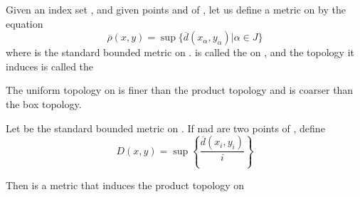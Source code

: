 \begin{definition}\label{def:UniformMetric}
      Given an index set , and given points  and  of , let us define a metric \mt{
            \overline{\rho}
      } on  by the equation
      \begin{equation*}
            \overline{\rho}(x,y) = \sup\{
                  \overline{d}(x_{\alpha},y_{\alpha}) | \alpha \in J
            \}
      \end{equation*}
      where  is the standard bounded metric on . \mt{
            \overline{\rho}
      } is called the  on , and the topology it induces is called the 
\end{definition}

\begin{theorem} \omitObviuos
      The uniform topology on  is finer than the product topology and is coarser than the box topology.
\end{theorem}

\begin{theorem}
      Let  be the standard bounded metric on . If  nad  are two points of , define
      \begin{equation*}
            D(x,y) = \sup\left\{
                  \frac{\overline{d}(x_{i},y_{i})}{i}
            \right\}
      \end{equation*}

      Then  is a metric that induces the product topology on 
\end{theorem}

